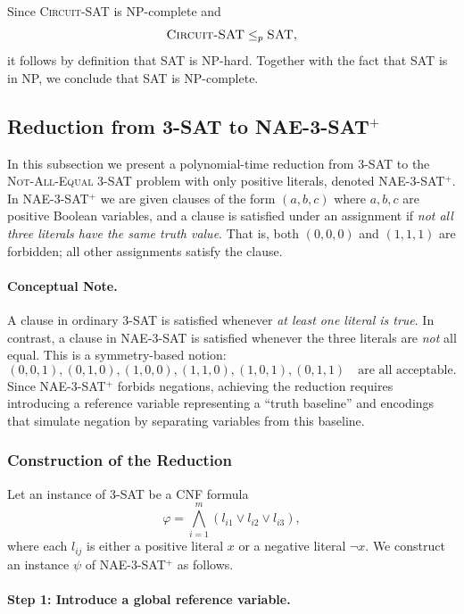 \documentclass[9pt]{extarticle}
\begin{document}
Since \textsc{Circuit-SAT} is NP-complete and
\[
    \textsc{Circuit-SAT} \le_p \textsc{SAT},
\]
it follows by definition that \textsc{SAT} is NP-hard.  Together with the fact
that \textsc{SAT} is in NP, we conclude that \textsc{SAT} is NP-complete.
\subsection{Reduction from \textsc{3-SAT} to \textsc{NAE-3-SAT}$^+$}

In this subsection we present a polynomial-time reduction from \textsc{3-SAT} to
the \textsc{Not-All-Equal 3-SAT} problem with only positive literals, denoted
\textsc{NAE-3-SAT}$^+$.  In \textsc{NAE-3-SAT}$^+$ we are given clauses of the
form $(a,b,c)$ where $a,b,c$ are positive Boolean variables, and a clause is
satisfied under an assignment if \emph{not all three literals have the same
truth value}.  That is, both $(0,0,0)$ and $(1,1,1)$ are forbidden; all other
assignments satisfy the clause.

\paragraph{Conceptual Note.}
A clause in ordinary 3-SAT is satisfied whenever \emph{at least one literal is
true}.  In contrast, a clause in NAE-3-SAT is satisfied whenever the three
literals are \emph{not} all equal.  This is a symmetry-based notion:
\[
(0,0,1), (0,1,0), (1,0,0), (1,1,0), (1,0,1), (0,1,1)\quad\text{are all acceptable}.
\]
Since \textsc{NAE-3-SAT}$^+$ forbids negations, achieving the reduction requires
introducing a reference variable representing a ``truth baseline'' and
encodings that simulate negation by separating variables from this baseline.

\subsubsection*{Construction of the Reduction}

Let an instance of \textsc{3-SAT} be a CNF formula
\[
\varphi = \bigwedge_{i=1}^m (l_{i1} \lor l_{i2} \lor l_{i3}),
\]
where each $l_{ij}$ is either a positive literal $x$ or a negative literal
$\neg x$.  We construct an instance $\psi$ of \textsc{NAE-3-SAT}$^+$ as follows.

\paragraph{Step 1: Introduce a global reference variable.}
\end{document}
